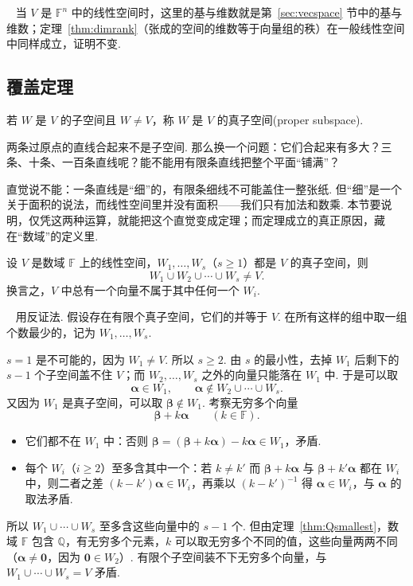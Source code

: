 \documentclass[lang=cn,10.5pt,scheme=chinese,toc=twocol,section,chinesefont=nofont,
twoside,citestyle=gb7714-2015,bibstyle=gb7714-2015]{elegantbook}
\DeclareRobustCommand{\textbf}[1]{{\lnsemiboldlatin\lnsemiboldcjk #1}}
\newcommand{\vv}[1]{\boldsymbol{#1}}
\newcommand{\zero}{\boldsymbol{0}}          %
\numberwithin{equation}{section}   %
\newcommand{\hC}{\texorpdfstring{\textdaggerdbl}{‡}}
\newcommand*{\lnlabel}[1]{{\sffamily\bfseries\color{black}#1}}
\renewenvironment{proof}{%
	\par\noindent\lnlabel{\proofname}\;\ \color{black!90}\cfs}{\par}
\renewenvironment{remark}{\noindent\lnlabel{\remarkname}\ }{\par}
\begin{document}
\begin{remark}
  当 $V$ 是 $\mathbb{F}^n$ 中的线性空间时，这里的基与维数就是第~\ref{sec:vecspace} 节中的基与维数；定理~\ref{thm:dimrank}（张成的空间的维数等于向量组的秩）在一般线性空间中同样成立，证明不变.
\end{remark}

\subsection{\hC 覆盖定理}\label{sec:cover}

若 $W$ 是 $V$ 的子空间且 $W\ne V$，称 $W$ 是 $V$ 的\textbf{真子空间}(proper subspace).

\begin{motivebox}
  两条过原点的直线合起来不是子空间. 那么换一个问题：它们合起来有\textbf{多大}？三条、十条、一百条直线呢？能不能用有限条直线把整个平面“铺满”？

  直觉说不能：一条直线是“细”的，有限条细线不可能盖住一整张纸. 但“细”是一个关于面积的说法，而线性空间里并没有面积——我们只有加法和数乘. 本节要说明，仅凭这两种运算，就能把这个直觉变成定理；而定理成立的真正原因，藏在“数域”的定义里.
\end{motivebox}

\begin{theorem}[覆盖定理]\label{thm:cover}
  设 $V$ 是数域 $\mathbb{F}$ 上的线性空间，$W_1,\ldots,W_s$（$s\ge1$）都是 $V$ 的真子空间，则
  \[W_1\cup W_2\cup\cdots\cup W_s\ne V.\]
  换言之，$V$ 中总有一个向量不属于其中任何一个 $W_i$.
\end{theorem}
\begin{proof}
  用反证法. 假设存在有限个真子空间，它们的并等于 $V$. 在所有这样的组中取一组\textbf{个数最少}的，记为 $W_1,\ldots,W_s$.

  $s=1$ 是不可能的，因为 $W_1\ne V$. 所以 $s\ge2$. 由 $s$ 的最小性，去掉 $W_1$ 后剩下的 $s-1$ 个子空间盖不住 $V$；而 $W_2,\ldots,W_s$ 之外的向量只能落在 $W_1$ 中. 于是可以取
  \[\vv\alpha\in W_1,\qquad\vv\alpha\notin W_2\cup\cdots\cup W_s.\]
  又因为 $W_1$ 是真子空间，可以取 $\vv\beta\notin W_1$. 考察无穷多个向量
  \[\vv\beta+k\vv\alpha\qquad(k\in\mathbb{F}).\]
  \begin{itemize}
    \item 它们都不在 $W_1$ 中：否则 $\vv\beta=(\vv\beta+k\vv\alpha)-k\vv\alpha\in W_1$，矛盾.
    \item 每个 $W_i$（$i\ge2$）\textbf{至多}含其中一个：若 $k\ne k'$ 而 $\vv\beta+k\vv\alpha$ 与 $\vv\beta+k'\vv\alpha$ 都在 $W_i$ 中，则二者之差 $(k-k')\vv\alpha\in W_i$，再乘以 $(k-k')^{-1}$ 得 $\vv\alpha\in W_i$，与 $\vv\alpha$ 的取法矛盾.
  \end{itemize}
  所以 $W_1\cup\cdots\cup W_s$ 至多含这些向量中的 $s-1$ 个. 但由定理~\ref{thm:Qsmallest}，数域 $\mathbb{F}$ 包含 $\mathbb{Q}$，有无穷多个元素，$k$ 可以取无穷多个不同的值，这些向量两两不同（$\vv\alpha\ne\zero$，因为 $\zero\in W_2$）. 有限个子空间装不下无穷多个向量，与 $W_1\cup\cdots\cup W_s=V$ 矛盾.
\end{proof}
\end{document}
